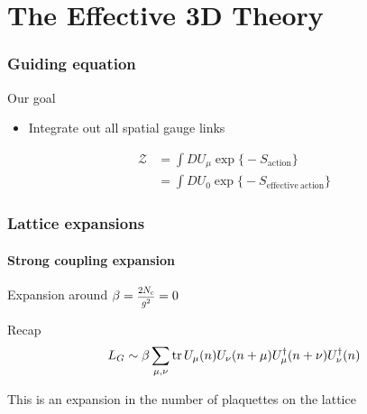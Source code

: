 \documentclass[12pt,a4paper,dvipsnames,usenames]{beamer}
\begin{document}
\section{The Effective 3D Theory}
\sectionframe

\begin{frame}
  \frametitle{Guiding equation}

  \begin{alertblock}{Our goal}
    \begin{itemize}
      \item \color{LightUIBase} Integrate out all spatial gauge links
    \end{itemize}
    \begin{align*}
      \mathcal{Z} &= \int D U_{\mu} \exp\big\{ \minus S_{\mathrm{action}} \big\} \\
      &= \int D U_0 \exp\big\{ \minus S_{\mathrm{effective \: action}} \big\}
    \end{align*}
  \end{alertblock}
  
\end{frame}

\begin{frame}
  \frametitle{Lattice expansions}
  \framesubtitle{Strong coupling expansion}

  Expansion around $\beta = \scalebox{0.75}{$\displaystyle\frac{2 N_c}{g^2}$} = 0$

  \vspace{2em}

  \begin{block}{Recap}
    \[ L_G \sim \beta\sum_{\mu,\nu} \operatorname{tr} U_{\mu}(n) U_{\nu}(n+\mu) U^{\dagger}_{\mu}(n+\nu) U^{\dagger}_{\nu}(n) \]
  \end{block}

  \vspace{1em}

  This is an expansion in the number of plaquettes on the lattice
  
\end{frame}
\end{document}
